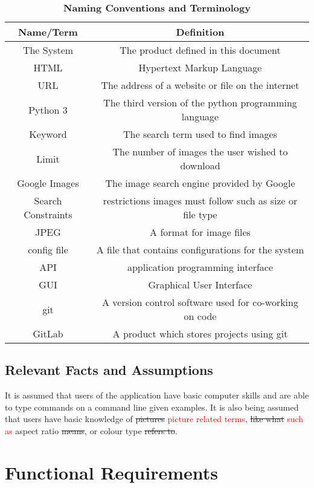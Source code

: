 \documentclass[12pt, titlepage]{article}
\begin{document}
\begin{table}[ht]
\caption{\bf Naming Conventions and Terminology}
\begin{tabular}{ |c|c| } 
 \hline
 \textbf{Name/Term} & \textbf{Definition}\\ 
 \hline
 The System & The product defined in this document\\
 \hline
 HTML & Hypertext Markup Language \\ 
 \hline 
URL & The address of a website or file on the internet \\ 
 \hline
 Python 3 & The third version of the python programming language \\
 \hline
 Keyword & The search term used to find images\\
 \hline
 Limit & The number of images the user wished to download\\
 \hline
 Google Images & The image search engine provided by Google\\
 \hline
 Search Constraints & restrictions images must follow such as size or file type\\
 \hline
 JPEG & A format for image files\\ 
 \hline
 config file & A file that contains configurations for the system\\
 \hline
 API & application programming interface\\
 \hline
 GUI & Graphical User Interface\\
 \hline
 git & A version control software used for co-working on code\\
 \hline
 GitLab & A product which stores projects using git\\
 \hline
\end{tabular}
\end{table}

\subsection{Relevant Facts and Assumptions}

It is assumed that users of the application have basic computer skills and are able to type commands on a command line given examples. It is also being assumed that users have basic knowledge of \st{pictures} \textcolor{red}{picture related terms}, \st{like what} \textcolor{red}{such as} aspect ratio \st{means}, or colour type \st{refers to}.

\section{Functional Requirements}
\end{document}
